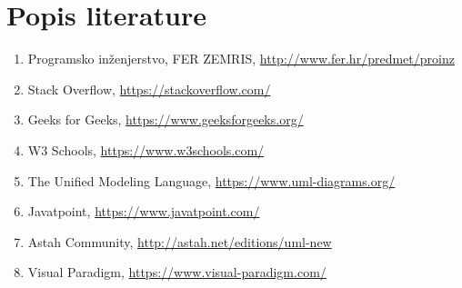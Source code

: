 \chapter*{Popis literature}
		
		
		\begin{enumerate}
			
			
			\item  Programsko inženjerstvo, FER ZEMRIS, \url{http://www.fer.hr/predmet/proinz}
			
			\item Stack Overflow,
			\url{https://stackoverflow.com/}
			
			\item  Geeks for Geeks,
			\url{https://www.geeksforgeeks.org/}
			
			\item  W3 Schools,
			\url{https://www.w3schools.com/}
			
			\item  The Unified Modeling Language, \url{https://www.uml-diagrams.org/}
			
			\item  Javatpoint, \url{https://www.javatpoint.com/}
			
			\item  Astah Community, \url{http://astah.net/editions/uml-new}
			\item Visual Paradigm, \url{https://www.visual-paradigm.com/}
		\end{enumerate}
		
		 